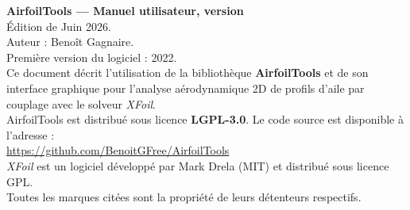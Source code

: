 \documentclass[11pt,a4paper,oneside]{report}
\newcommand{\manueldate}{Juin 2026}
\newcommand{\manuelauteur}{Beno\^{i}t Gagnaire}
\newcommand{\manuelpremieredition}{2022}
\begin{document}
\thispagestyle{empty}
\null
\vfill
\begin{flushleft}
    \small
    \textbf{AirfoilTools --- Manuel utilisateur, version \manuelversion}\\
    Édition de \manueldate.\\[0.5em]
    Auteur : \manuelauteur.\\
    Première version du logiciel : \manuelpremieredition.\\[1em]

    Ce document décrit l'utilisation de la bibliothèque
    \textbf{AirfoilTools} et de son interface graphique pour
    l'analyse aérodynamique 2D de profils d'aile par couplage avec
    le solveur \emph{XFoil}.\\[0.5em]

    AirfoilTools est distribué sous licence \textbf{LGPL-3.0}.
    Le code source est disponible à l'adresse :\\
    \url{https://github.com/BenoitGFree/AirfoilTools}\\[0.5em]

    \emph{XFoil} est un logiciel développé par Mark Drela (MIT) et
    distribué sous licence GPL.\\[0.5em]

    Toutes les marques citées sont la propriété de leurs détenteurs
    respectifs.
\end{flushleft}
\clearpage

\tableofcontents
\clearpage
\listoffigures
\clearpage











\end{document}
